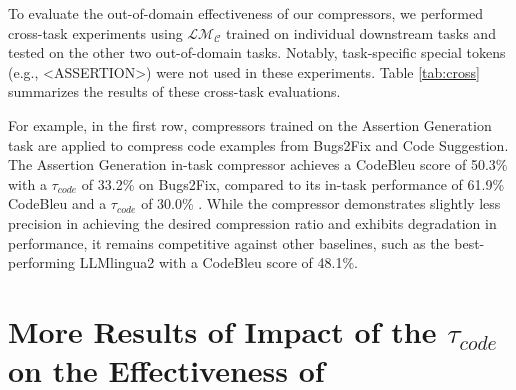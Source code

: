 To evaluate the out-of-domain effectiveness of our compressors, we performed cross-task experiments using $\mathcal{LM_C}$ trained on individual downstream tasks and tested on the other two out-of-domain tasks. Notably, task-specific special tokens (e.g., <ASSERTION>) were not used in these experiments. Table \ref{tab:cross} summarizes the results of these cross-task evaluations.

For example, in the first row, compressors trained on the Assertion Generation task are applied to compress code examples from Bugs2Fix and Code Suggestion. The Assertion Generation in-task compressor achieves a CodeBleu score of 50.3\% with a $\tau_{code}$ of 33.2\% on Bugs2Fix, compared to its in-task performance of 61.9\% CodeBleu and a $\tau_{code}$ of 30.0\% . While the compressor demonstrates slightly less precision in achieving the desired compression ratio and exhibits degradation in performance, it remains competitive against other baselines, such as the best-performing LLMlingua2 with a CodeBleu score of 48.1\%.




\section{More Results of Impact of the $\tau_{code}$ on the Effectiveness of \ourtool}\label{sec:appendix_ratio}



